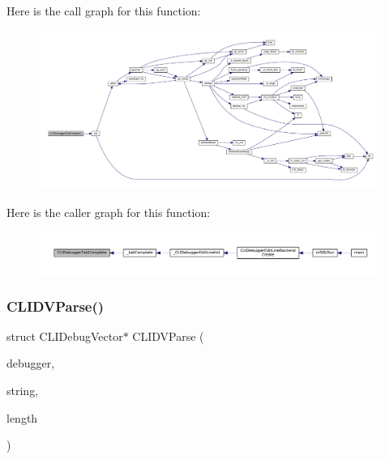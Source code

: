 Here is the call graph for this function\+:
\nopagebreak
\begin{figure}[H]
\begin{center}
\leavevmode
\includegraphics[width=350pt]{debugger_2cli-debugger_8c_aa4166246fff2288dedfb505e6f5936bc_cgraph}
\end{center}
\end{figure}
Here is the caller graph for this function\+:
\nopagebreak
\begin{figure}[H]
\begin{center}
\leavevmode
\includegraphics[width=350pt]{debugger_2cli-debugger_8c_aa4166246fff2288dedfb505e6f5936bc_icgraph}
\end{center}
\end{figure}
\mbox{\label{debugger_2cli-debugger_8c_a12f3a50d17ea7ee9edd8703a1e57f1ad}} 
\subsubsection{\texorpdfstring{C\+L\+I\+D\+V\+Parse()}{CLIDVParse()}}
{\footnotesize\ttfamily struct C\+L\+I\+Debug\+Vector$\ast$ C\+L\+I\+D\+V\+Parse (\begin{DoxyParamCaption}\item[{struct C\+L\+I\+Debugger $\ast$}]{debugger,  }\item[{const char $\ast$}]{string,  }\item[{size\+\_\+t}]{length }\end{DoxyParamCaption})}

